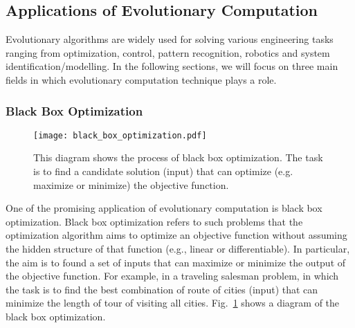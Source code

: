\subsection{Applications of Evolutionary Computation}\label{sec:application_evolutionary_computation}

Evolutionary algorithms are widely used for solving various engineering tasks ranging from optimization, control, pattern recognition, robotics and system identification/modelling. In the following sections, we will focus on three main fields in which evolutionary computation technique plays a role. 

\subsubsection{Black Box Optimization}\label{sec:black_box_optimization}

\begin{figure}[!t]
  \centering
  \texttt{[image: black\_box\_optimization.pdf]}
  \caption{This diagram shows the process of black box optimization. The task is to find a candidate solution (input) that can optimize (e.g. maximize or minimize) the objective function.}
  \label{fig:black_box_optimization}
\end{figure}

One of the promising application of evolutionary computation is black box optimization. Black box optimization refers to such problems that the optimization algorithm aims to optimize an objective function without assuming the hidden structure of that function (e.g., linear or differentiable). In particular, the aim is to found a set of inputs that can maximize or minimize the output of the objective function. For example, in a traveling salesman problem, in which the task is to find the best combination of route of cities (input) that can minimize the length of tour of visiting all cities. Fig.~\ref{fig:black_box_optimization} shows a diagram of the black box optimization.

